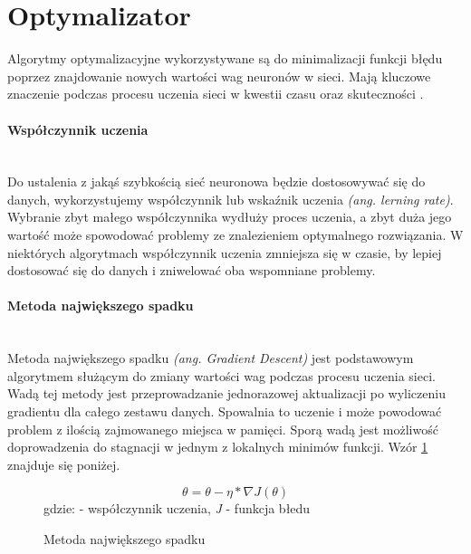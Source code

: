 \section{Optymalizator}

Algorytmy optymalizacyjne wykorzystywane są do minimalizacji funkcji błędu poprzez
znajdowanie nowych wartości wag neuronów w sieci. Mają kluczowe
znaczenie podczas procesu uczenia sieci w kwestii czasu oraz skuteczności \cite{typesOfOptimizationAlgorithms}.

\paragraph{Współczynnik uczenia} \mbox{}\\
Do ustalenia z jakąś szybkością sieć neuronowa będzie dostosowywać się do danych, wykorzystujemy
współczynnik lub wskaźnik uczenia \textit{(ang. lerning rate)}. Wybranie zbyt małego
współczynnika wydłuży proces uczenia, a zbyt duża jego wartość może spowodować problemy
ze znalezieniem optymalnego rozwiązania. W niektórych algorytmach współczynnik uczenia
zmniejsza się w czasie, by lepiej dostosować się do danych i zniwelować oba wspomniane problemy.

\paragraph{Metoda największego spadku} \mbox{}\\
Metoda największego spadku \textit{(ang. Gradient Descent)} jest podstawowym algorytmem
służącym do zmiany wartości wag podczas procesu uczenia sieci.
Wadą tej metody jest przeprowadzanie jednorazowej aktualizacji po wyliczeniu gradientu dla
całego zestawu danych. Spowalnia to uczenie i może powodować problem z ilością zajmowanego
miejsca w pamięci. Sporą wadą jest możliwość doprowadzenia do stagnacji w jednym z
lokalnych minimów funkcji. Wzór \ref{eq:gradientdescent} znajduje się poniżej.
\begin{figure}[h!]
\renewcommand{\figurename}{Wzór}%
\begin{equation*}
\theta = \theta - \eta * \nabla J(\theta)
\end{equation*}
\centering
gdzie: \texteta - współczynnik uczenia, \textit{J} - funkcja błedu
\caption{Metoda największego spadku}
\label{eq:gradientdescent}
\end{figure}\\

